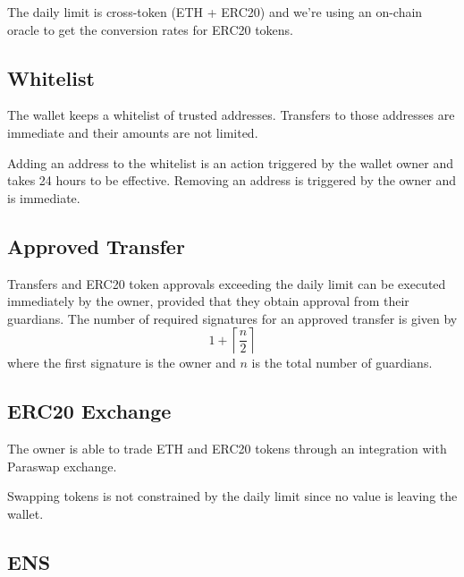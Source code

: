 \documentclass[12pt]{article}
\begin{document}
The daily limit is cross-token (ETH + ERC20) and we're using an on-chain oracle to get the conversion rates for ERC20 tokens.

\subsection{Whitelist}
\label{sec:whitelist}

The wallet keeps a whitelist of trusted addresses. Transfers to those addresses are immediate and their amounts are not limited.

Adding an address to the whitelist is an action triggered by the wallet owner and takes 24 hours to be effective. Removing an address is triggered by the owner and is immediate.

\subsection{Approved Transfer}
\label{sec:approved-transfer}

Transfers and ERC20 token approvals exceeding the daily limit can be executed immediately by the owner, provided that they obtain approval from their guardians. The number of required signatures for an approved transfer is given by
\begin{equation*}
    1+\left\lceil {\frac{n}{2}} \right\rceil
\end{equation*}
where the first signature is the owner and $n$ is the total number of guardians.

\subsection{ERC20 Exchange}

The owner is able to trade ETH and ERC20 tokens through an integration with Paraswap exchange.

Swapping tokens is not constrained by the daily limit since no value is leaving the wallet.

\subsection{ENS}
\end{document}
